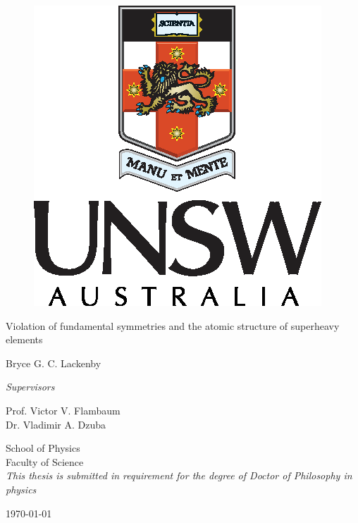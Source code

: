 \documentclass[10pt,a4paper, twoside, openright]{report}
\begin{document}
\begin{titlepage}
	\vspace{10cm}
	\centering
	\begin{figure}
\centering
\includegraphics[scale=1.2]{./figures/unsw-crest.eps}
\captionsetup[figure]{list=no}
\end{figure}
    \captionsetup[figure]{list=no}
	\vspace{3cm}
	\vfill
	{\huge Violation of fundamental symmetries and the atomic structure of superheavy elements\par}
	\vspace{2cm}
	{\Large Bryce G. C. Lackenby \par}
	\vfill
	{\normalsize \textit{Supervisors}\par}
	{\large Prof. Victor V. Flambaum} \\
	{\large Dr. Vladimir A. Dzuba} \\
	\centering

	\vfill

{\normalsize School of Physics \\
Faculty of Science } \\
\vspace{0.5cm}
{\footnotesize \textit{This thesis is submitted in requirement for the degree of Doctor of Philosophy in physics}} \\
\vspace{0.5cm}
	{\large \today\par}
\end{titlepage}
\onehalfspacing
\newpage
{}
\tableofcontents
\end{document}
